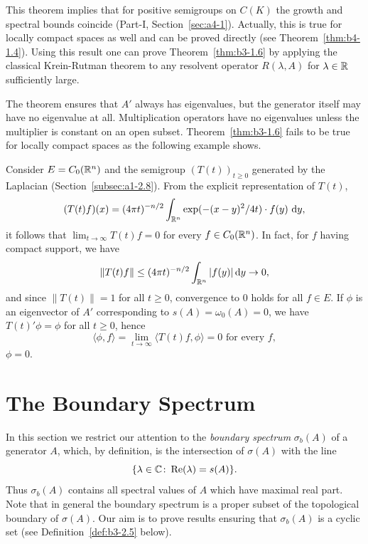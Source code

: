 This theorem implies that for positive semigroups on $C(K)$ the growth and spectral bounds coincide (\cf Part-I, Section~\ref{sec:a4-1}).
Actually, this is true for locally compact spaces as well and can be proved directly (see Theorem~\ref{thm:b4-1.4}).
Using this result one can prove Theorem~\ref{thm:b3-1.6} by applying the classical Krein-Rutman theorem to any resolvent operator $R(\lambda,A)$ for $\lambda \in \mathbb{R}$ sufficiently large.

The theorem ensures that $A'$ always has eigenvalues, but the generator itself may have no eigenvalue at all.
Multiplication operators have no eigenvalues unless the multiplier is constant on an open subset.
Theorem~\ref{thm:b3-1.6} fails to be true for locally compact spaces as the following example shows.
\begin{example}\label{ex:b3-1.7}
	Consider $E = C_{0}(\mathbb{R}^{n})$ and the semigroup $(T(t))_{t \geq 0}$ generated by the Laplacian (\cf Section~\ref{subsec:a1-2.8}).
From the explicit representation of\/ $T(t)$,
	\begin{equation}\label{eq:b3-1.17}
		(T(t)f)(x) = (4\pi t)^{-n/2}\int_{\mathbb{R}^{n}} \exp(-(x-y)^{2}/4t)\cdot f(y) \, \mathop{}\!\mathrm{d}{y}  , 
	\end{equation}
	it follows that $\lim_{t \to \infty}T(t)f = 0$ for every $f \in C_{0}(\mathbb{R}^{n})$. In fact, for $f$ having compact support, we have     
    \[
    \|T(t)f\| \leq (4\pi t)^{-n/2}\int_{\R^{n}} |f(y)| \dy \to 0 , 
    \]
    and since $\|T(t)\| = 1$ for all $t \geq 0$, convergence to $0$ holds for all  $f\in E$.
	If\/ $\phi$ is an eigenvector of\/ $A'$ corresponding to $s(A) = \omega_{0}(A) = 0$, we have $T(t)'\phi = \phi$ for all $t \geq 0$, hence 
    \[
    \langle \phi,f \rangle = \lim_{t \to \infty}\langle T(t)f,\phi \rangle = 0 \text{ for every } f , 
    \]
    \ie $\phi = 0$.
\end{example}
\section{The Boundary Spectrum}\label{sec:b3-2}%
In this section we restrict our attention to the \emph{boundary spectrum}%
$\sigma_{b}(A)$ of a generator $A$, which, by definition, is the intersection of\/ $\sigma(A)$ with the line 
\[
\{\lambda \in \mathbb{C} \colon \mathop{}\!\mathrm{Re}(\lambda) = s(A)\} .
\]
Thus $\sigma_{b}(A)$ contains all spectral values of\/ $A$ which have maximal real part.
Note that in general the boundary spectrum is a proper subset of the topological boundary of\/ $\sigma(A)$.
Our aim is to prove results ensuring that $\sigma_{b}(A)$ is a cyclic set (see Definition~\ref{def:b3-2.5} below).

